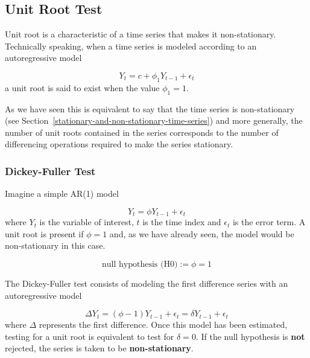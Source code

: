 \subsection{Unit Root Test}\label{unit-root-test}

Unit root is a characteristic of a time series that makes it non-stationary. Technically speaking, when a time series is modeled according to an autoregressive model 

\begin{equation}
Y_t = c + \phi_1 Y_{t-1} + \epsilon_t
\end{equation} 
a unit root is said to exist when the value \(\phi_1 = 1\).

As we have seen this is equivalent to say that the time series is non-stationary (see  Section~\ref{stationary-and-non-stationary-time-series}) and more generally, the number of unit roots contained in the series corresponds to the number of differencing operations required to make the series stationary.

\subsubsection{Dickey-Fuller Test}\label{dickey-fuller-test}

Imagine a simple AR(1) model

\begin{equation}
Y_t = \phi Y_{t − 1} + \epsilon_t
\end{equation}
where \(Y_t\) is the variable of interest, \(t\) is the time index and \(\epsilon_t\) is the error term. A unit root is present if \(\phi = 1\) and, as we have already seen, the model would be non-stationary in this case.

\begin{equation*}
\textrm{null hypothesis (H0)}:= \phi =1
\end{equation*}

The Dickey-Fuller test consists of modeling the first difference series with an autoregressive model

\begin{equation}
\Delta Y_t = (\phi − 1) Y_{t − 1} + \epsilon_t = \delta Y_{t − 1} + \epsilon_t
\end{equation}
where \(\Delta\) represents the first difference. Once this model has been estimated, testing for a unit root is equivalent to test for \(\delta = 0\). If the null hypothesis is \textbf{not} rejected, the series is taken to be \textbf{non-stationary}.

